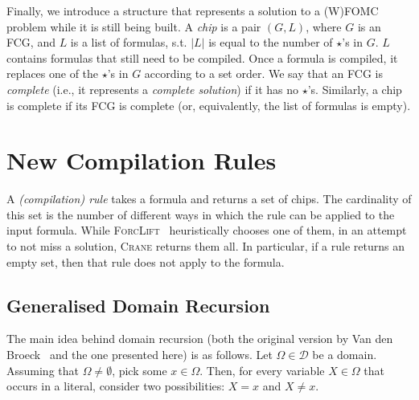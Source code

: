 \documentclass{article}
\begin{document}
Finally, we introduce a structure that represents a solution to a (W)FOMC
problem while it is still being built. A \emph{chip} is a pair $(G, L)$, where
$G$ is an FCG, and $L$ is a list of formulas, s.t. $|L|$ is equal to the number
of $\star$'s in $G$. $L$ contains formulas that still need to be compiled. Once
a formula is compiled, it replaces one of the $\star$'s in $G$ according to a
set order. We say that an FCG is \emph{complete} (i.e., it represents a
\emph{complete solution}) if it has no $\star$'s. Similarly, a chip is complete
if its FCG is complete (or, equivalently, the list of formulas is empty).

\section{New Compilation Rules}\label{sec:rules}

A \emph{(compilation) rule} takes a formula and returns a set of chips. The
cardinality of this set is the number of different ways in which the rule can be
applied to the input formula. While
\textsc{ForcLift}~\cite{DBLP:conf/ijcai/BroeckTMDR11} heuristically chooses one
of them, in an attempt to not miss a solution, \textsc{Crane} returns them all.
In particular, if a rule returns an empty set, then that rule does not apply to
the formula.

\subsection{Generalised Domain Recursion}\label{sec:dr}

The main idea behind domain recursion (both the original version by Van den
Broeck~ and the one presented here) is as
follows. Let $\Omega \in \mathcal{D}$ be a domain. Assuming that
$\Omega \ne \emptyset$, pick some $x \in \Omega$. Then, for every variable
$X \in \Omega$ that occurs in a literal, consider two possibilities: $X = x$ and
$X \ne x$.
\end{document}
